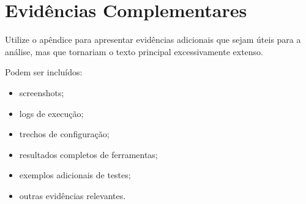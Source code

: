 \appendix

\section{Evidências Complementares}

Utilize o apêndice para apresentar evidências adicionais que
sejam úteis para a análise, mas que tornariam o texto principal
excessivamente extenso.

Podem ser incluídos:

\begin{itemize}
    \item screenshots;
    \item logs de execução;
    \item trechos de configuração;
    \item resultados completos de ferramentas;
    \item exemplos adicionais de testes;
    \item outras evidências relevantes.
\end{itemize}
